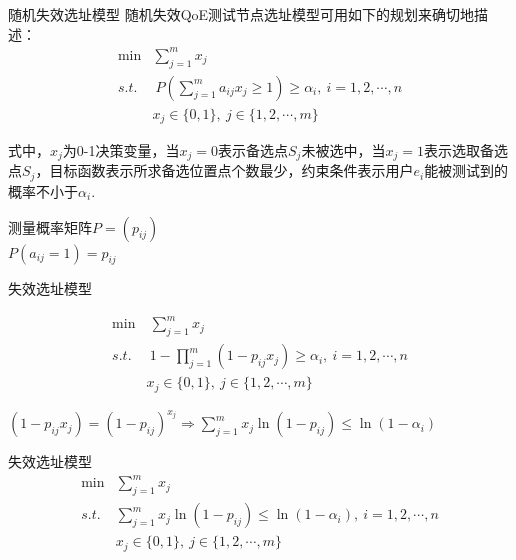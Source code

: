\documentclass[10pt]{beamer}
\begin{document}
\begin{frame}{随机失效选址模型}
  随机失效QoE测试节点选址模型可用如下的规划来确切地描述：
  \begin{align*}
    \min & \sum_{j=1}^m x_j\\
    s.t.&\ P(\sum_{j=1}^m a_{ij}x_j\geq 1)\geq \alpha_i,\ i=1,2,\cdots,n\\
    &x_j\in\{0,1\},\ j\in \{1,2,\cdots,m\}
  \end{align*}

  
式中，$x_j$为0-1决策变量，当$x_j=0$表示备选点$S_j$未被选中，当$x_j=1$表示选取备选点$S_j$，目标函数表示所求备选位置点个数最少，约束条件表示用户$e_i$能被测试到的概率不小于$\alpha_i$.
\end{frame}
\begin{frame}
测量概率矩阵$P=(p_{ij})$ \\$P(a_{ij}=1)=p_{ij}$
\begin{block}{失效选址模型}
  
\begin{align*}
    \min &\  \sum_{j=1}^m x_j\\
    s.t.&\ 1-\prod_{j=1}^m(1-p_{ij}x_j)\geq \alpha_i,\ i=1,2,\cdots,n\\
    &x_j\in\{0,1\},\ j\in \{1,2,\cdots,m\}
  \end{align*}
\end{block}
\end{frame}

\begin{frame}
$(1-p_{ij}x_j)=(1-p_{ij})^{x_j}\Longrightarrow \sum_{j=1}^m x_j\ln(1-p_{ij})\leq \ln(1-\alpha_i)$
\begin{block}{失效选址模型}
  \begin{align*}
    \min & \sum_{j=1}^m x_j\\
    s.t.&\sum_{j=1}^m x_j\ln(1-p_{ij})\leq \ln(1-\alpha_i),\ i=1,2,\cdots,n\\
    &x_j\in\{0,1\},\ j\in \{1,2,\cdots,m\}
  \end{align*}
\end{block}
  
\end{frame}
\end{document}
